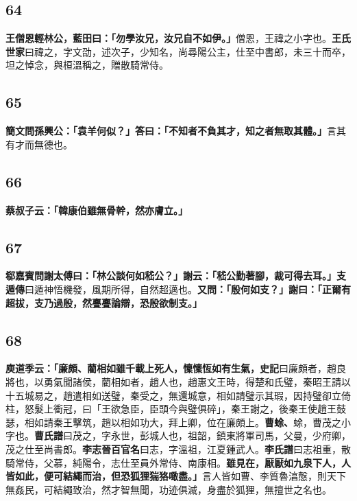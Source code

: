 \subsection*{64}

\textbf{王僧恩輕林公，藍田曰：「勿學汝兄，汝兄自不如伊。」}{\footnotesize 僧恩，王禕之小字也。\textbf{王氏世家}曰禕之，字文劭，述次子，少知名，尚尋陽公主，仕至中書郎，未三十而卒，坦之悼念，與桓溫稱之，贈散騎常侍。}

\subsection*{65}

\textbf{簡文問孫興公：「袁羊何似？」答曰：「不知者不負其才，知之者無取其體。」}{\footnotesize 言其有才而無德也。}

\subsection*{66}

\textbf{蔡叔子云：「韓康伯雖無骨幹，然亦膚立。」}

\subsection*{67}

\textbf{郗嘉賓問謝太傅曰：「林公談何如嵇公？」謝云：「嵇公勤著腳，裁可得去耳。」}{\footnotesize \textbf{支遁傳}曰遁神悟機發，風期所得，自然超邁也。}\textbf{又問：「殷何如支？」謝曰：「正爾有超拔，支乃過殷，然亹亹論辯，恐殷欲制支。」}

\subsection*{68}

\textbf{庾道季云：「廉頗、藺相如雖千載上死人，懍懍恆如有生氣，}{\footnotesize \textbf{史記}曰廉頗者，趙良將也，以勇氣聞諸侯，藺相如者，趙人也，趙惠文王時，得楚和氏璧，秦昭王請以十五城易之，趙遣相如送璧，秦受之，無還城意，相如請璧示其瑕，因持璧卻立倚柱，怒髮上衝冠，曰「王欲急臣，臣頭今與璧俱碎」，秦王謝之，後秦王使趙王鼓瑟，相如請秦王擊筑，趙以相如功大，拜上卿，位在廉頗上。}\textbf{曹蜍、}{\footnotesize 蜍，曹茂之小字也。\textbf{曹氏譜}曰茂之，字永世，彭城人也，祖韶，鎮東將軍司馬，父曼，少府卿，茂之仕至尚書郎。}\textbf{李志}{\footnotesize \textbf{晉百官名}曰志，字溫祖，江夏鍾武人。\textbf{李氏譜}曰志祖重，散騎常侍，父慕，純陽令，志仕至員外常侍、南康相。}\textbf{雖見在，厭厭如九泉下人，人皆如此，便可結繩而治，但恐狐狸猯狢噉盡。」}{\footnotesize 言人皆如曹、李質魯湻慤，則天下無姦民，可結繩致治，然才智無聞，功迹俱滅，身盡於狐狸，無擅世之名也。}

